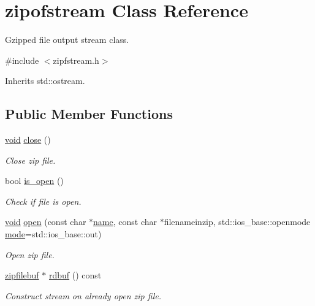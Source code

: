 \hypertarget{classzipofstream}{}\section{zipofstream Class Reference}
\label{classzipofstream}


Gzipped file output stream class.  




{\ttfamily \#include $<$zipfstream.\+h$>$}



Inherits std\+::ostream.

\subsection*{Public Member Functions}
\begin{DoxyCompactItemize}
\item 
\hyperlink{lp__lib_8h_ac7828c7b2b31d2e11af17bdb6289c5d9}{void} \hyperlink{classzipofstream_ab9be37134f23d38fdcdaa136328fa1d7}{close} ()
\begin{DoxyCompactList}\small\item\em Close zip file. \end{DoxyCompactList}\item 
bool \hyperlink{classzipofstream_a1fbae1253cfada27c581b7813c272c6d}{is\+\_\+open} ()
\begin{DoxyCompactList}\small\item\em Check if file is open. \end{DoxyCompactList}\item 
\hyperlink{lp__lib_8h_ac7828c7b2b31d2e11af17bdb6289c5d9}{void} \hyperlink{classzipofstream_a3545bccfc1fe8de52d1fd5d9f1139dd7}{open} (const char $\ast$\hyperlink{lp__lib_8h_a2946c588fc7fa2fa5b43ac54b7872725}{name}, const char $\ast$filenameinzip, std\+::ios\+\_\+base\+::openmode \hyperlink{ioapi_8h_ab77191763734fbb3e515371393ccb606}{mode}=std\+::ios\+\_\+base\+::out)
\begin{DoxyCompactList}\small\item\em Open zip file. \end{DoxyCompactList}\item 
\hyperlink{classzipfilebuf}{zipfilebuf} $\ast$ \hyperlink{classzipofstream_a069ea0c4e9b4a9b6fe7a93c277f0cc6d}{rdbuf} () const
\begin{DoxyCompactList}\small\item\em Construct stream on already open zip file. \end{DoxyCompactList}\item 

\end{DoxyCompactItemize}
